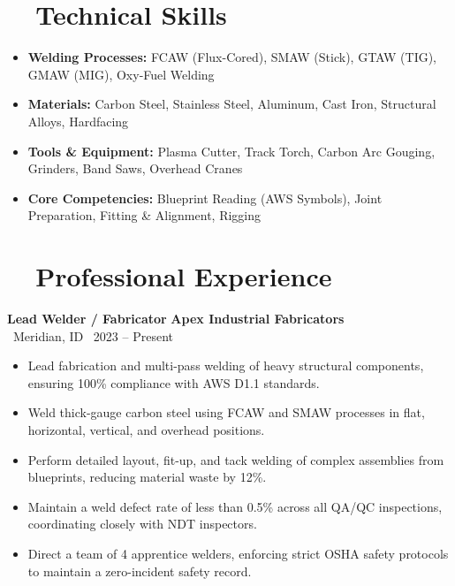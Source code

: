 \documentclass[10pt]{article}
\newcommand{\jobheader}[4]{
  \noindent
  {\bfseries\color{darktext}#1} \hfill \textbf{\color{primary}#2} \\
  {\small\color{gray}\faMapMarker~#3} \hfill {\small\color{gray}\faCalendar~#4}
  \par\vspace{3pt}
}
\begin{document}
\section*{\faCogs~~Technical Skills}
\begin{itemize}
  \item \textbf{Welding Processes:} FCAW (Flux-Cored), SMAW (Stick), GTAW (TIG), GMAW (MIG), Oxy-Fuel Welding
  \item \textbf{Materials:} Carbon Steel, Stainless Steel, Aluminum, Cast Iron, Structural Alloys, Hardfacing
  \item \textbf{Tools \& Equipment:} Plasma Cutter, Track Torch, Carbon Arc Gouging, Grinders, Band Saws, Overhead Cranes
  \item \textbf{Core Competencies:} Blueprint Reading (AWS Symbols), Joint Preparation, Fitting \& Alignment, Rigging
\end{itemize}

\section*{\faBriefcase~~Professional Experience}

\jobheader{Lead Welder / Fabricator}{Apex Industrial Fabricators}{Meridian, ID}{2023 -- Present}
\begin{itemize}
  \item Lead fabrication and multi-pass welding of heavy structural components, ensuring 100\% compliance with AWS D1.1 standards.
  \item Weld thick-gauge carbon steel using FCAW and SMAW processes in flat, horizontal, vertical, and overhead positions.
  \item Perform detailed layout, fit-up, and tack welding of complex assemblies from blueprints, reducing material waste by 12\%.
  \item Maintain a weld defect rate of less than 0.5\% across all QA/QC inspections, coordinating closely with NDT inspectors.
  \item Direct a team of 4 apprentice welders, enforcing strict OSHA safety protocols to maintain a zero-incident safety record.
\end{itemize}

\vspace{4pt}
\end{document}
